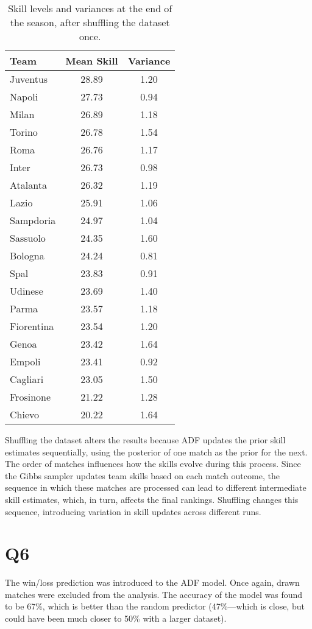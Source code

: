 \begin{table}[h!]
\centering
\begin{tabular}{|l|c|c|}
\hline
\textbf{Team} & \textbf{Mean Skill} & \textbf{Variance} \\
\hline
Juventus & 28.89 & 1.20 \\
Napoli & 27.73 & 0.94 \\
Milan & 26.89 & 1.18 \\
Torino & 26.78 & 1.54 \\
Roma & 26.76 & 1.17 \\
Inter & 26.73 & 0.98 \\
Atalanta & 26.32 & 1.19 \\
Lazio & 25.91 & 1.06 \\
Sampdoria & 24.97 & 1.04 \\
Sassuolo & 24.35 & 1.60 \\
Bologna & 24.24 & 0.81 \\
Spal & 23.83 & 0.91 \\
Udinese & 23.69 & 1.40 \\
Parma & 23.57 & 1.18 \\
Fiorentina & 23.54 & 1.20 \\
Genoa & 23.42 & 1.64 \\
Empoli & 23.41 & 0.92 \\
Cagliari & 23.05 & 1.50 \\
Frosinone & 21.22 & 1.28 \\
Chievo & 20.22 & 1.64 \\
\hline
\end{tabular}
\caption{Skill levels and variances at the end of the season, after shuffling the dataset once.}
\label{table:skills2}
\end{table}

Shuffling the dataset alters the results because ADF updates the prior skill estimates sequentially, using the posterior of one match as the prior for the next. The order of matches influences how the skills evolve during this process. Since the Gibbs sampler updates team skills based on each match outcome, the sequence in which these matches are processed can lead to different intermediate skill estimates, which, in turn, affects the final rankings. Shuffling changes this sequence, introducing variation in skill updates across different runs.

\section*{Q6}
The win/loss prediction was introduced to the ADF model. Once again, drawn matches were excluded from the analysis. The accuracy of the model was found to be 67\%, which is better than the random predictor (47\%—which is close, but could have been much closer to 50\% with a larger dataset).



